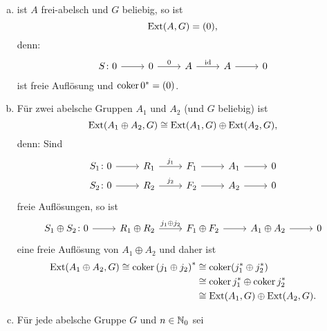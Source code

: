 \begin{beispiel}
  \begin{enumerate}[(a)]
    \item 
      ist $A$ frei-abelsch und $G$ beliebig, so ist
      \begin{equation*}
        \mathrm{Ext}(A,G) = (0),
      \end{equation*}
      denn:
      \begin{equation*}
        \begin{tikzcd}
          S\colon 0 \arrow{r}{}  & 0 \arrow{r}{0}  & A \arrow{r}{\id}  & A \arrow{r}{} & 0
        \end{tikzcd}
      \end{equation*}
      ist freie Auflösung und $\operatorname{coker} 0^* = (0)$.
    \item
      Für zwei abelsche Gruppen $A_1$ und $A_2$ (und $G$ beliebig) ist
      \begin{equation*}
        \mathrm{Ext}(A_1 \oplus A_2,G) \cong \mathrm{Ext}(A_1,G) \oplus \mathrm{Ext}(A_2,G),
      \end{equation*}
      denn: Sind
      \begin{equation*}
        \begin{tikzcd}[row sep=tiny]
          S_1\colon 0 \arrow{r}{}  & R_1 \arrow{r}{j_1}  & F_1 \arrow{r}{}  & A_1 \arrow{r}{} & 0 \\
          S_2\colon 0 \arrow{r}{}  & R_2 \arrow{r}{j_2}  & F_2 \arrow{r}{}  & A_2 \arrow{r}{} & 0
        \end{tikzcd}
      \end{equation*}
      freie Auflösungen, so ist
      \begin{equation*}
        \begin{tikzcd}[row sep=tiny]
          S_1 \oplus S_2\colon 0 \arrow{r}{}  & R_1 \oplus R_2 \arrow{r}{j_1 \oplus j_2}  & F_1 \oplus F_2 \arrow{r}{}  & A_1 \oplus A_2 \arrow{r}{} & 0
        \end{tikzcd}
      \end{equation*}
      eine freie Auflösung von $A_1 \oplus A_2$ und daher ist
      \begin{align*}
        \mathrm{Ext}(A_1 \oplus A_2,G) \cong \operatorname{coker} {(j_1 \oplus j_2)}^* 
          & \cong \operatorname{coker} (j_1^* \oplus j_2^*) \\
          & \cong \operatorname{coker} j_1^* \oplus \operatorname{coker} j_2^* \\
          & \cong \mathrm{Ext}(A_1,G) \oplus \mathrm{Ext}(A_2,G).
      \end{align*}
    \item
      Für jede abelsche Gruppe $G$ und $n \in \mathbb{N}_0$ sei

\end{enumerate}
\end{beispiel}
